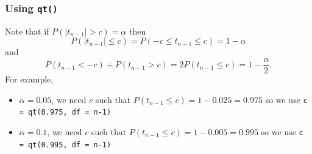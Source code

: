 \documentclass[a4paper]{article}
\begin{document}
\subsubsection{Using \lstinline|qt()|}
Note that if \( P(\lvert t_{n-1} \rvert > c) = \alpha \) then
\[
	P(\lvert t_{n-1} \rvert \leq c) = P(-c \leq t_{n-1} \leq c) = 1 - \alpha
\]
and
\[
	P(t_{n-1} < -c) + P(t_{n-1} > c) = 2P(t_{n-1} \leq c) = 1 - \frac{\alpha}{2}.
\]
For example,
\begin{itemize}
	\item \( \alpha = 0.05 \), we need \( c \) such that \( P(t_{n-1} \leq c) = 1 - 0.025 = 0.975 \) so we use \lstinline|c = qt(0.975, df = n-1)|
	\item \( \alpha = 0.1 \), we need \( c \) such that \( P(t_{n-1} \leq c) = 1 - 0.005 = 0.995 \) so we use \lstinline|c = qt(0.995, df = n-1)|
\end{itemize}
\end{document}
